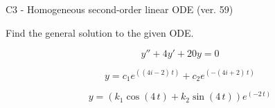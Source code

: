 \begin{exercise}
  \begin{exerciseTitle}C3 - Homogeneous second-order linear ODE (ver. 59)\end{exerciseTitle}
  \begin{exerciseStatement}
    
Find the general solution to the given ODE.

    
\[y''+4y'+20y = 0\]

  \end{exerciseStatement}
  \begin{exerciseAnswer}
    
\[y= c_{1} e^{\left(\left(4 i - 2\right) \, t\right)} + c_{2} e^{\left(-\left(4 i + 2\right) \, t\right)}\]

    
\[y= {\left(k_{1} \cos\left(4 \, t\right) + k_{2} \sin\left(4 \, t\right)\right)} e^{\left(-2 \, t\right)}\]

  \end{exerciseAnswer}
\end{exercise}
